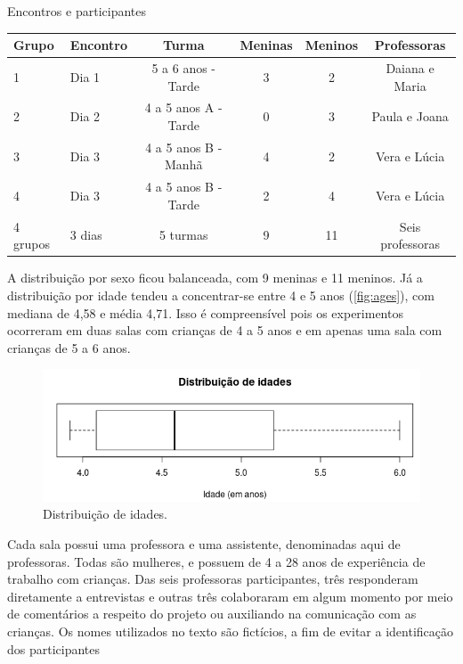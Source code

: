  \begin{quadro}[!h]
 		\setlength{\extrarowheight}{3pt}
        \begin{center}
        \caption{Encontros e participantes}
        \label{quadro:participants}
        \begin{tabular}{@{}llcccc@{}}
            \toprule
            Grupo & Encontro & Turma                    & Meninas & Meninos & Professoras \\ \midrule
            1     & Dia 1    & 5 a 6 anos - Tarde       & 3       & 2       & Daiana e Maria \\
            2     & Dia 2    & 4 a 5 anos A - Tarde     & 0       & 3       & Paula e Joana \\
            3     & Dia 3    & 4 a 5 anos B - Manhã     & 4       & 2       & Vera e Lúcia \\
            4     & Dia 3    & 4 a 5 anos B - Tarde     & 2       & 4       & Vera e Lúcia \\ \midrule
            4 grupos   & 3 dias & 5 turmas              & 9       & 11      & Seis professoras \\ \bottomrule 
            \end{tabular}
        \end{center}
        \sourceauthor
    \end{quadro}

A distribuição por sexo ficou balanceada, com 9 meninas e 11 meninos. Já a distribuição por idade tendeu a concentrar-se entre 4 e 5 anos (\autoref{fig:ages}), com mediana de 4,58 e média 4,71. Isso é compreensível pois os experimentos ocorreram em duas salas com crianças de 4 a 5 anos e em apenas uma sala com crianças de 5 a 6 anos.

\begin{figure}[!htpb]
    \centering
    \includegraphics[width=.6\linewidth,fbox]{figs/ages.png}
    \caption{Distribuição de idades.}
    \sourceauthor
    \label{fig:ages}
\end{figure}

Cada sala possui uma professora e uma assistente, denominadas aqui de professoras. Todas são mulheres, e possuem de 4 a 28 anos de experiência de trabalho com crianças. Das seis professoras participantes, três responderam diretamente a entrevistas e outras três colaboraram em algum momento por meio de comentários a respeito do projeto ou auxiliando na comunicação com as crianças. Os nomes utilizados no texto são fictícios, a fim de evitar a identificação dos participantes
 
